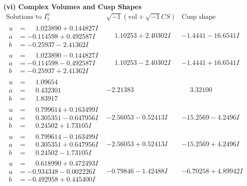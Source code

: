 \documentclass[1p]{elsarticle_modified}
\theoremstyle{definition}
\newcommand{\I}{\sqrt{-1}}
\begin{document}
\newpage\flushleft \textbf{(vi) Complex Volumes and Cusp Shapes}
$$\begin{array}{c|c|c}  
\text{Solutions to }I^u_{1}& \I (\text{vol} + \sqrt{-1}CS) & \text{Cusp shape}\\
 \hline 
\begin{aligned}
u &= \phantom{-}1.023890 + 0.144827 I \\
a &= -0.114598 + 0.492587 I \\
b &= -0.25937 - 2.41362 I\end{aligned}
 & \phantom{-}1.10253 + 2.40302 I & -1.4441 - 16.6541 I \\ \hline\begin{aligned}
u &= \phantom{-}1.023890 - 0.144827 I \\
a &= -0.114598 - 0.492587 I \\
b &= -0.25937 + 2.41362 I\end{aligned}
 & \phantom{-}1.10253 - 2.40302 I & -1.4441 + 16.6541 I \\ \hline\begin{aligned}
u &= \phantom{-}1.09654\phantom{ +0.000000I} \\
a &= \phantom{-}0.432301\phantom{ +0.000000I} \\
b &= \phantom{-}1.83917\phantom{ +0.000000I}\end{aligned}
 & -2.21383\phantom{ +0.000000I} & \phantom{-}3.32100\phantom{ +0.000000I} \\ \hline\begin{aligned}
u &= \phantom{-}0.799614 + 0.163499 I \\
a &= \phantom{-}0.305351 - 0.647956 I \\
b &= \phantom{-}0.24502 + 1.73105 I\end{aligned}
 & -2.56053 - 0.52413 I & -15.2569 - 4.2496 I \\ \hline\begin{aligned}
u &= \phantom{-}0.799614 - 0.163499 I \\
a &= \phantom{-}0.305351 + 0.647956 I \\
b &= \phantom{-}0.24502 - 1.73105 I\end{aligned}
 & -2.56053 + 0.52413 I & -15.2569 + 4.2496 I \\ \hline\begin{aligned}
u &= \phantom{-}0.618990 + 0.472493 I \\
a &= -0.934348 - 0.002226 I \\
b &= -0.492958 + 0.445400 I\end{aligned}
 & -0.79846 - 1.42488 I & -6.70258 + 4.89942 I \\ \hline\begin{aligned}

\end{aligned}
\end{array}$$
\end{document}

